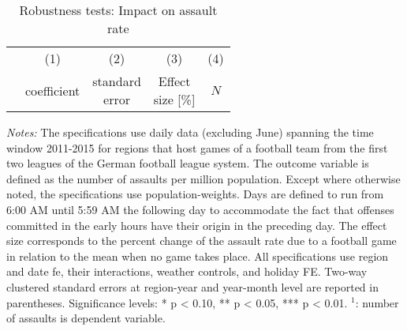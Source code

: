 \begin{table}[t] \centering 
	\begin{threeparttable} \centering \caption{Robustness tests: Impact on assault rate}\label{tab_soc_ext:reg_fe_assrate_robustness}
		{\def\sym#1{\ifmmode^{#1}\else\(^{#1}\)\fi} 
			\begin{tabular}{l*{4}{c}}
				\toprule 
				&\multicolumn{1}{c}{(1)}&\multicolumn{1}{c}{(2)}&\multicolumn{1}{c}{(3)}&\multicolumn{1}{c}{(4)}\\
				& coefficient & \clb{c}{standard\\error} & \clb{c}{Effect\\ size [\%]} & $N$ \\
				\midrule
				 
				\bottomrule 
		\end{tabular}}
		\begin{tablenotes} 
			\item \scriptsize \emph{Notes:} The specifications use daily data (excluding June) spanning the time window 2011-2015 for regions that host games of a football team from the first two leagues of the German football league system. The outcome variable is defined as the number of assaults per million population. Except where otherwise noted, the specifications use population-weights. Days are defined to run from 6:00 AM until 5:59 AM the following day to accommodate the fact that offenses committed in the early hours have their origin in the preceding day. The effect size corresponds to the percent change of the assault rate due to a football game in relation to the mean when no game takes place. All specifications use region and date fe, their interactions, weather controls, and holiday FE. Two-way clustered standard errors at region-year and year-month level are reported in parentheses. \newline Significance levels: * p < 0.10, ** p < 0.05, *** p < 0.01.\newline \hspace*{15pt} $^1$: number of assaults is dependent variable.
		\end{tablenotes} 
	\end{threeparttable} 
\end{table}